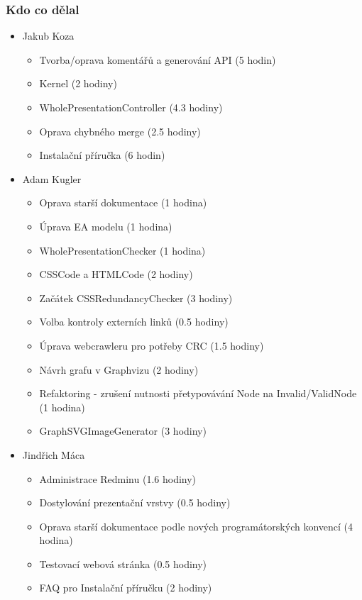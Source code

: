 \documentclass{beamer}
\begin{document}
\begin{frame}[allowframebreaks]\frametitle{Kdo co dělal} 
  \begin{itemize}
    \item Jakub Koza
      \begin{itemize}
       		 \item Tvorba/oprava komentářů a generování API (5 hodin)
			 \item Kernel (2 hodiny)
			 \item WholePresentationController (4.3 hodiny)
			 \item Oprava chybného merge (2.5 hodiny)
			 \item Instalační příručka (6 hodin)
     \end{itemize}

    \item Adam Kugler
      \begin{itemize}
       \item Oprava starší dokumentace (1 hodina)
			 \item Úprava EA modelu (1 hodina)
       \item WholePresentationChecker (1 hodina)
			 \item CSSCode a HTMLCode (2 hodiny)
       \item Začátek CSSRedundancyChecker (3 hodiny)
       \item Volba kontroly externích linků (0.5 hodiny)
			 \item Úprava webcrawleru pro potřeby CRC (1.5 hodiny)
			 \item Návrh grafu v Graphvizu (2 hodiny)
       \item Refaktoring - zrušení nutnosti přetypovávání Node na Invalid/ValidNode (1 hodina)
			 \item GraphSVGImageGenerator (3 hodiny)
     \end{itemize}

    \item Jindřich Máca
      \begin{itemize}
       \item Administrace Redminu (1.6 hodiny)
			 \item Dostylování prezentační vrstvy (0.5 hodiny)
			 \item Oprava starší dokumentace podle nových programátorských konvencí (4 hodina)
			 \item Testovací webová stránka (0.5 hodiny)
			 \item FAQ pro Instalační příručku (2 hodiny)
     \end{itemize}


\end{itemize}
\end{frame}
\end{document}
